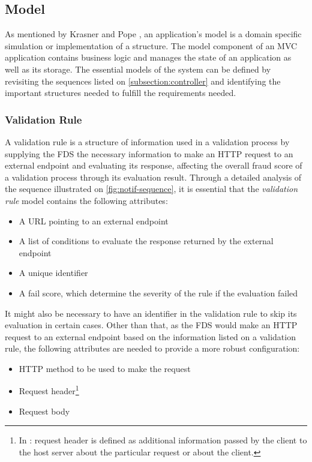 \subsection{Model}
  \label{subsection:model}

As mentioned by Krasner and Pope \autocite{krasner-pope-88}, an application's model is a domain specific simulation or implementation of a structure. The model component of an MVC application contains business logic and manages the state of an application as well as its storage. 
The essential models of the system can be defined by revisiting the sequences listed on \autoref{subsection:controller} and identifying the important structures needed to fulfill the requirements needed.
  
\subsubsection{Validation Rule}
  \label{subsub:rule}

A validation rule is a structure of information used in a validation process by supplying the FDS the necessary information to make an HTTP request to an external endpoint and evaluating its response, affecting the overall fraud score of a validation process through its evaluation result. Through a detailed analysis of the sequence illustrated on \autoref{fig:notif-sequence}, it is essential that the \emph{validation rule} model contains the following attributes:

\begin{itemize}
  \item A URL pointing to an external endpoint
  \item A list of conditions to evaluate the response returned by the external endpoint
  \item A unique identifier
  \item A fail score, which determine the severity of the rule if the evaluation failed
\end{itemize}

It might also be necessary to have an identifier in the validation rule to skip its evaluation in certain cases. Other than that, as the FDS would make an HTTP request to an external endpoint based on the information listed on a validation rule, the following attributes are needed to provide a more robust configuration:

\begin{itemize}
  \item HTTP method to be used to make the request
  \item Request header\footnote{In \autocite[\enquote{5.3 Request Header Fields}]{http-rfc}: request header is defined as additional information passed by the client to the host server about the particular request or about the client.}
  \item Request body
\end{itemize}

